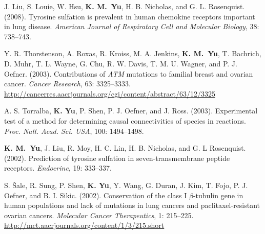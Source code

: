 \documentclass[10pt]{article}
\begin{document}
\begin{bibenum}
    \item  J. Liu, S. Louie, W. Hsu, \textbf{K. M.~Yu},
      H. B. Nicholas, and G. L. Rosenquist. (2008). Tyrosine
        sulfation is prevalent in human chemokine receptors important
        in lung disease. \emph{American Journal of Respiratory Cell and Molecular Biology}, 38:
      738--743.  

      \item Y. R. Thorstenson, A. Roxas, R. Kroiss, M. A. Jenkins,
        \textbf{K. M.~Yu}, T. Bachrich, D.  Muhr, T. L. Wayne, G. Chu,
        R. W. Davis, T. M. U. Wagner, and P. J. Oefner. (2003). 
        Contributions of \textit{ATM} mutations to familial breast and
        ovarian cancer. \emph{Cancer Research}, 63:
        3325--3333. \url{http://cancerres.aacrjournals.org/cgi/content/abstract/63/12/3325}  

    \item A. S. Torralba, \textbf{K. Yu}, P. Shen, P. J. Oefner, and
      J. Ross. (2003). Experimental
        test of a method for determining causal connectivities of
        species in reactions. \textit{Proc. Natl. Acad. Sci. USA},
      100: 1494--1498. 

    \item \textbf{K. M.~Yu}, J. Liu, R. Moy, H. C. Lin,
      H. B. Nicholas, and G. L Rosenquist. (2002). Prediction of
      tyrosine sulfation in seven-transmembrane peptide receptors.
    \emph{Endocrine}, 19: 333--337.  

    \item S. \v{S}ale, R. Sung, P. Shen, \textbf{K. Yu}, Y. Wang,
      G. Duran, J. Kim, T. Fojo, P. J. Oefner, and
      B. I. Sikic. (2002). Conservation
        of the class I $\beta$-tubulin gene in human populations and
        lack of mutations in lung cancers and paclitaxel-resistant
        ovarian cancers. \emph{Molecular Cancer Therapeutics}, 1:
        215--225. \url{http://mct.aacrjournals.org/content/1/3/215.short} 

\end{bibenum}

\vspace{0.1in}
\end{document}
